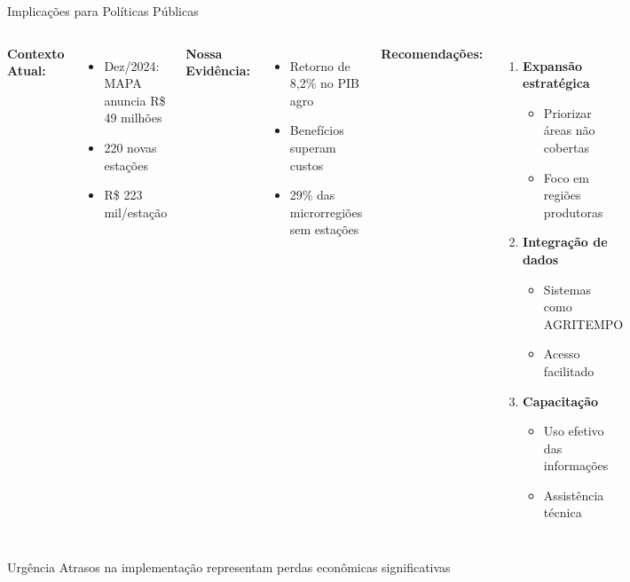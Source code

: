 \documentclass[10pt,aspectratio=169]{beamer}
\begin{document}
\begin{frame}{Implicações para Políticas Públicas}
\begin{columns}
\textbf{Contexto Atual:}
\begin{itemize}
    \item Dez/2024: MAPA anuncia R\$ 49 milhões
    \item 220 novas estações
    \item R\$ 223 mil/estação
\end{itemize}

\textbf{Nossa Evidência:}
\begin{itemize}
    \item Retorno de 8,2\% no PIB agro
    \item Benefícios superam custos
    \item 29\% das microrregiões sem estações
\end{itemize}

\textbf{Recomendações:}
\begin{enumerate}
    \item \textbf{Expansão estratégica}
    \begin{itemize}
        \item Priorizar áreas não cobertas
        \item Foco em regiões produtoras
    \end{itemize}
    
    \item \textbf{Integração de dados}
    \begin{itemize}
        \item Sistemas como AGRITEMPO
        \item Acesso facilitado
    \end{itemize}
    
    \item \textbf{Capacitação}
    \begin{itemize}
        \item Uso efetivo das informações
        \item Assistência técnica
    \end{itemize}
\end{enumerate}
\end{columns}

\begin{block}{Urgência}
Atrasos na implementação representam perdas econômicas significativas
\end{block}
\end{frame}
\end{document}
